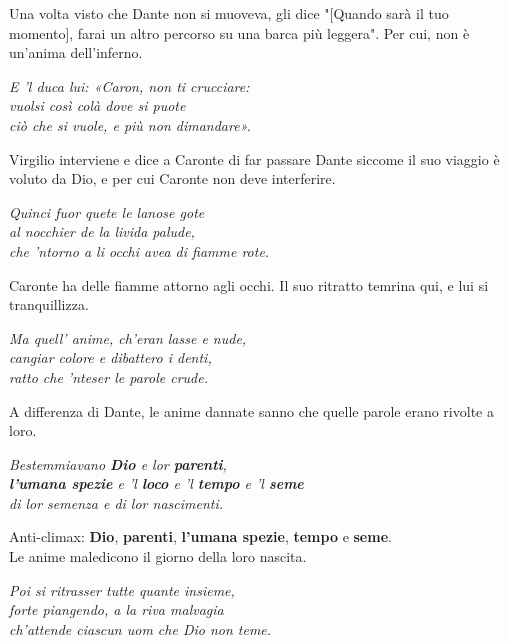 \documentclass[a4paper]{article}
\begin{document}
Una volta visto che Dante non si muoveva, gli dice
"[Quando sarà il tuo momento], farai un altro percorso su una barca più leggera".
Per cui, non è un'anima dell'inferno.

\begin{center}
    \textit{E 'l duca lui: «Caron, non ti crucciare:} \\
    \textit{vuolsi così colà dove si puote} \\
    \textit{ciò che si vuole, e più non dimandare».}
\end{center}

Virgilio interviene e dice a Caronte di far passare Dante
siccome il suo viaggio è voluto da Dio, e per cui Caronte non deve interferire.

\begin{center}
    \textit{Quinci fuor quete le lanose gote} \\
    \textit{al nocchier de la livida palude,} \\
    \textit{che 'ntorno a li occhi avea di fiamme rote.}
\end{center}

Caronte ha delle fiamme attorno agli occhi. Il suo ritratto temrina qui, e lui si tranquillizza.

\begin{center}
    \textit{Ma quell' anime, ch'eran lasse e nude,} \\
    \textit{cangiar colore e dibattero i denti,} \\
    \textit{ratto che 'nteser le parole crude.}
\end{center}

A differenza di Dante, le anime dannate sanno che quelle parole erano rivolte a loro.

\begin{center}
    \textit{Bestemmiavano \textbf{Dio} e lor \textbf{parenti},} \\
    \textit{\textbf{l'umana spezie} e 'l \textbf{loco} e 'l \textbf{tempo} e 'l \textbf{seme}} \\
    \textit{di lor semenza e di lor nascimenti.}
\end{center}

Anti-climax: \textbf{Dio}, \textbf{parenti}, \textbf{l'umana spezie}, \textbf{tempo}
e \textbf{seme}. \\
Le anime maledicono il giorno della loro nascita.

\begin{center}
    \textit{Poi si ritrasser tutte quante insieme,} \\
    \textit{forte piangendo, a la riva malvagia} \\
    \textit{ch'attende ciascun uom che Dio non teme.}
\end{center}
\end{document}
